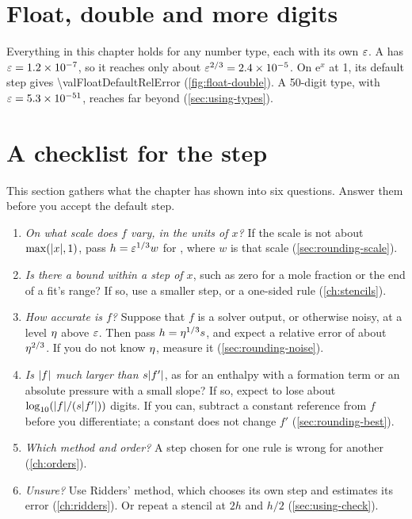 \section{Float, double and more digits}\label{sec:rounding-types}

Everything in this chapter holds for any number type, each with its own $\varepsilon$. A  has $\varepsilon =
\num{1.2e-7}$, so it reaches only about $\varepsilon^{2/3} = \num{2.4e-5}$. On
$\mathrm{e}^x$ at 1, its default step gives \num{\valFloatDefaultRelError} (\cref{fig:float-double}). A 50-digit type,
with $\varepsilon = \num{5.3e-51}$, reaches far beyond  (\cref{sec:using-types}).

\begin{marginfigure}
\centering

\caption{The V of  for  and , on $\mathrm{e}^x$ at 1. The floor of each
curve lies at or below $\epsmach^{2/3}$ of its type (dashed). The rounding scatter reaches a decade or more below
that level.\label{fig:float-double}}
\end{marginfigure}

\section{A checklist for the step}\label{sec:rounding-checklist}

This section gathers what the chapter has shown into six questions. Answer them before you accept the default step.
\begin{enumerate}
  \item \emph{On what scale does $f$ vary, in the units of $x$?} If the scale is not about $\max(\lvert x \rvert, 1)$, pass
    $h = \varepsilon^{1/3} w$ for , where $w$ is that scale (\cref{sec:rounding-scale}).
  \item \emph{Is there a bound within a step of $x$}, such as zero for a mole fraction or the end of a fit's range?
    If so, use a smaller step, or a one-sided rule (\cref{ch:stencils}).
  \item \emph{How accurate is $f$?} Suppose that $f$ is a solver output, or otherwise noisy, at a level $\eta$
    above $\varepsilon$. Then pass $h = \eta^{1/3} s$, and expect a relative error of about $\eta^{2/3}$. If
    you do not know $\eta$, measure it (\cref{sec:rounding-noise}).
  \item \emph{Is $\lvert f \rvert$ much larger than $s \lvert f' \rvert$}, as for an enthalpy with a formation term or an
    absolute pressure with a small slope? If so, expect to lose about $\log_{10} (\lvert f \rvert / (s \lvert f' \rvert))$
    digits. If you can, subtract a constant reference from $f$ before you differentiate; a constant does not change
    $f'$ (\cref{sec:rounding-best}).
  \item \emph{Which method and order?} A step chosen for one rule is wrong for another (\cref{ch:orders}).
  \item \emph{Unsure?} Use Ridders' method, which chooses its own step and estimates its error (\cref{ch:ridders}).
    Or repeat a stencil at $2h$ and $h/2$ (\cref{sec:using-check}).
\end{enumerate}
